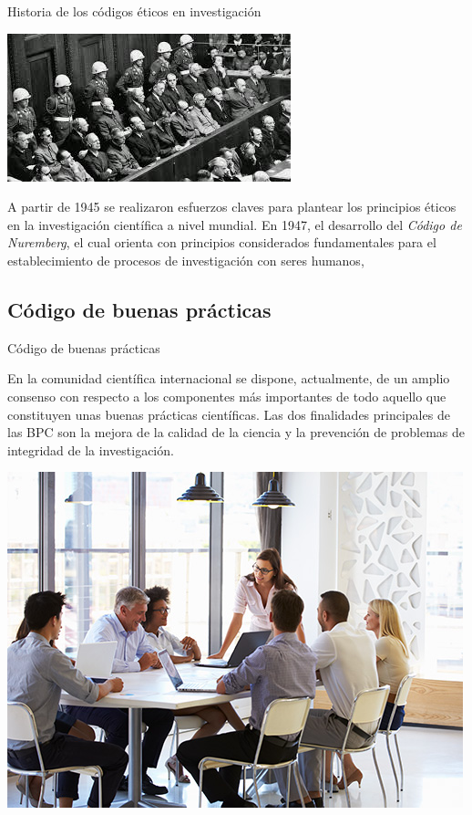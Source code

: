 \begin{frame}{Historia de los códigos éticos en investigación}
    \begin{minipage}{0.5\linewidth}
        \centering
        \includegraphics[scale=0.65]{images/ima7.jpeg}
    \end{minipage}
    \hspace{0.3cm}
    \begin{minipage}{0.45\linewidth}
    A partir de 1945 se realizaron esfuerzos claves para plantear los principios éticos en la investigación científica a nivel mundial. En 1947, el desarrollo
    del \textit{Código de Nuremberg}, el cual orienta con principios considerados fundamentales para el establecimiento de procesos de investigación
    con seres humanos,
    \end{minipage}
\end{frame}
\subsection{Código de buenas prácticas}
\begin{frame}{Código de buenas prácticas}
    \begin{minipage}{0.5\linewidth}
    En la comunidad científica internacional se dispone, actualmente, de un amplio consenso
    con respecto a los componentes más importantes de todo aquello que constituyen unas
    buenas prácticas científicas. Las dos finalidades principales de las BPC son la mejora
    de la calidad de la ciencia y la prevención de problemas de integridad de la investigación.
\end{minipage}
\hspace{0.2cm}
\begin{minipage}{0.45\linewidth}
    \centering
    \includegraphics[scale=0.4]{images/ima8.jpg}
\end{minipage}
\end{frame}
